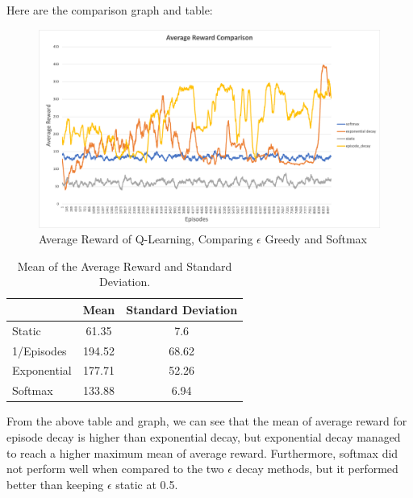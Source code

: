 Here are the comparison graph and table:

\begin{figure}[H] %
    \centering
    \includegraphics[width=0.75\linewidth]{comp_result.png}
    \caption{Average Reward of Q-Learning, Comparing $\epsilon$ Greedy and Softmax}
\end{figure}

\begin{table}[H]
\centering
\begin{tabular}[t]{lcc}
\toprule
& Mean &Standard Deviation\\
\midrule
Static & 61.35 &7.6\\
1/Episodes & 194.52 & 68.62\\
Exponential & 177.71 & 52.26\\
Softmax & 133.88 & 6.94\\
\bottomrule
\end{tabular}
\caption{Mean of the Average Reward and Standard Deviation.}
\end{table}%

From the above table and graph, we can see that the mean of average reward for episode decay is higher than exponential decay, but exponential decay managed to reach a higher maximum mean of average reward. Furthermore, softmax did not perform well when compared to the two $\epsilon$ decay methods, but it performed better than keeping $\epsilon$ static at 0.5.